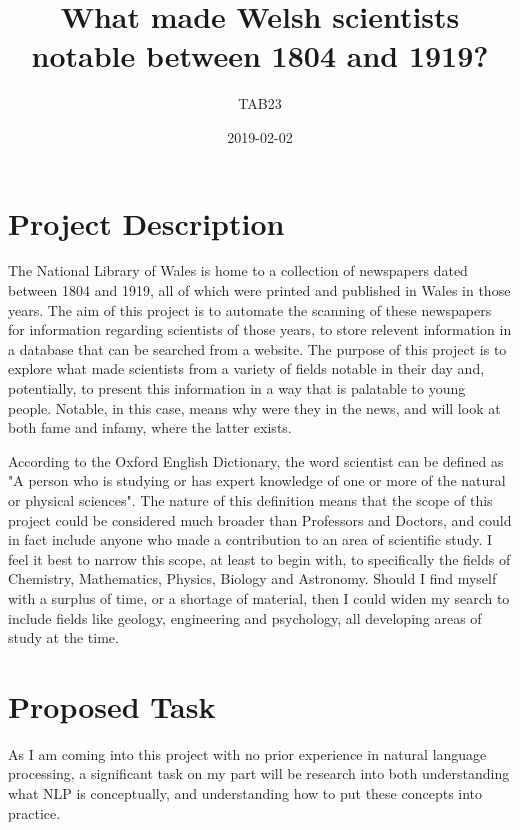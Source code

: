 \documentclass{article}
\title{What made Welsh scientists notable between 1804 and 1919?}
\date{2019-02-02}
\author{TAB23}
\begin{document}
\maketitle
\newpage
{}

\section{Project Description}
The National Library of Wales is home to a collection of newspapers dated between 1804 and 1919, all of which were printed and published in Wales in those years. The aim of this project is to automate the scanning of these newspapers for information regarding 			scientists of those years, to store relevent information in a database that can be searched from a website. The purpose of this project is to explore what made scientists from a variety of fields notable in their day and, potentially, to present this information in a way 			that is palatable to young people. Notable, in this case, means why were they in the news, and will look at both fame and infamy, where the latter exists.

According to the Oxford English Dictionary, the word scientist can be defined as "A person who is studying or has expert knowledge of one or more of the natural or physical sciences"\cite{scientist}. The nature of this definition means that the scope of this project could be considered much broader than Professors and Doctors, and could in fact include anyone who made a contribution to an area of scientific study. I feel it best to narrow this scope, at least to begin with, to specifically the fields of Chemistry, Mathematics, Physics, Biology and Astronomy. Should I find myself with a surplus of time, or a shortage of material, then I could widen my search to include fields like geology\cite{geoscience}, engineering and psychology\cite{psychist}, all developing areas of study at the time.

\section{Proposed Task}
As I am coming into this project with no prior experience in natural language processing, a significant task on my part will be research into both understanding what NLP is conceptually, and understanding how to put these concepts into practice.  
\end{document}
